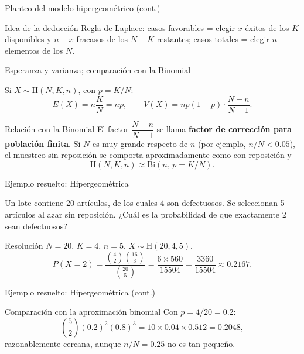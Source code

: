 \documentclass[aspectratio=169,11pt]{beamer}
\begin{document}
\begin{frame}{Planteo del modelo hipergeométrico (cont.)}
\begin{alertblock}{Idea de la deducción}
Regla de Laplace: casos favorables = elegir $x$ éxitos de los $K$ disponibles y $n-x$ fracasos de los $N-K$ restantes; casos totales = elegir $n$ elementos de los $N$.
\end{alertblock}
\end{frame}

\begin{frame}{Esperanza y varianza; comparación con la Binomial}
\begin{theorem}
Si $X\sim\text{H}(N,K,n)$, con $p=K/N$:
$$E(X) = n\frac{K}{N} = np, \qquad V(X) = np(1-p)\cdot\frac{N-n}{N-1}.$$
\end{theorem}

\begin{alertblock}{Relación con la Binomial}
El factor $\dfrac{N-n}{N-1}$ se llama \textbf{factor de corrección para población finita}. Si $N$ es muy grande respecto de $n$ (por ejemplo, $n/N < 0.05$), el muestreo sin reposición se comporta aproximadamente como con reposición y
$$\text{H}(N,K,n) \approx \text{Bi}(n,\,p=K/N).$$
\end{alertblock}
\end{frame}

\begin{frame}{Ejemplo resuelto: Hipergeométrica}
\begin{example}
Un lote contiene 20 artículos, de los cuales 4 son defectuosos. Se seleccionan 5 artículos al azar sin reposición. ¿Cuál es la probabilidad de que exactamente 2 sean defectuosos?
\end{example}

\begin{block}{Resolución}
$N=20$, $K=4$, $n=5$, $X\sim\text{H}(20,4,5)$.
$$P(X=2) = \frac{\binom{4}{2}\binom{16}{3}}{\binom{20}{5}} = \frac{6\times 560}{15504} = \frac{3360}{15504} \approx 0.2167.$$
\end{block}
\end{frame}

\begin{frame}{Ejemplo resuelto: Hipergeométrica (cont.)}
\begin{block}{Comparación con la aproximación binomial}
Con $p=4/20=0.2$:
$$\binom{5}{2}(0.2)^2(0.8)^3 = 10\times 0.04\times 0.512 = 0.2048,$$
razonablemente cercana, aunque $n/N=0.25$ no es tan pequeño.
\end{block}
\end{frame}
\end{document}

